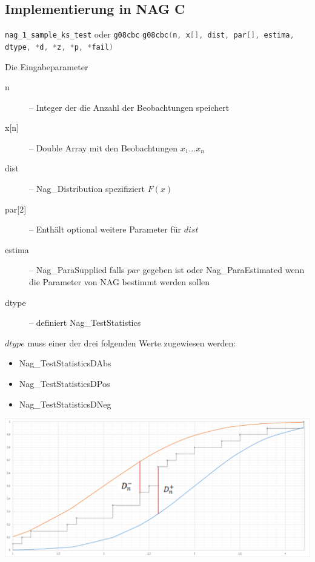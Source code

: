 \documentclass{beamer}
\begin{document}
\subsection{Implementierung in NAG C}
\begin{frame}[fragile]{\insertsubsection}
\begin{block}{\lstinline[language=C++]$nag_1_sample_ks_test$ oder \lstinline[language=C++]$g08cbc$}
	\lstinline[language=C++]$g08cbc(n, x[], dist, par[], estima, dtype, *d, *z, *p, *fail)$
\end{block}
\begin{block}{Die Eingabeparameter}
	\begin{description}
		\item[n] -- Integer der die Anzahl der Beobachtungen speichert
		\item[x{[n]}] -- Double Array mit den Beobachtungen $x_1...x_n$
		\item[dist] -- Nag\_Distribution spezifiziert $F(x)$
		\item[par{[2]}] -- Enthält optional weitere Parameter für $dist$
		\item[estima] -- Nag\_ParaSupplied falls $par$ gegeben ist oder Nag\_ParaEstimated wenn die Parameter von NAG bestimmt werden sollen
		\item[dtype] -- definiert Nag\_TestStatistics
	\end{description}
\end{block}
\end{frame}

\begin{frame}[fragile]{\insertsubsection}
\begin{example}[dtype]
$dtype$ muss einer der drei folgenden Werte zugewiesen werden:
	\begin{itemize}
		\item Nag\_TestStatisticsDAbs
		\item Nag\_TestStatisticsDPos
		\item Nag\_TestStatisticsDNeg
	\end{itemize}
	\center \includegraphics[width=.8\textwidth]{figures/diagramKSd-d+.png}
\end{example}
\end{frame}
\end{document}
